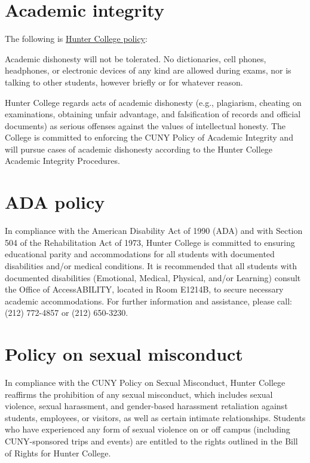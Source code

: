 \documentclass[11pt]{article}
\begin{document}
\section{Academic integrity}
The following is \href{https://www.hunter.cuny.edu/students/student-affairs/office-of-student-conduct/academic-integrity/}{Hunter College policy}:

Academic dishonesty will not be tolerated. No dictionaries, cell phones, headphones, or electronic devices of any kind are allowed during exams, nor is talking to other students, however briefly or for whatever reason.

Hunter College regards acts of academic dishonesty (e.g., plagiarism, cheating on examinations, obtaining unfair advantage, and falsification of records and official documents) as serious offenses against the values of intellectual honesty. The College is committed to enforcing the CUNY Policy of Academic Integrity and will pursue cases of academic dishonesty according to the Hunter College Academic Integrity Procedures.

\section{ADA policy}
In compliance with the American Disability Act of 1990 (ADA) and with Section 504 of the Rehabilitation Act of 1973, Hunter College is committed to ensuring educational parity and accommodations for all students with documented disabilities and/or medical conditions. It is recommended that all students with documented disabilities (Emotional, Medical, Physical, and/or Learning) consult the Office of AccessABILITY, located in Room E1214B, to secure necessary academic accommodations. For further information and assistance, please call: (212) 772-4857 or (212) 650-3230.

\section{Policy on sexual misconduct}
In compliance with the CUNY Policy on Sexual Misconduct, Hunter College reaffirms the prohibition of any sexual misconduct, which includes sexual violence, sexual harassment, and gender-based harassment retaliation against students, employees, or visitors, as well as certain intimate relationships. Students who have experienced any form of sexual violence on or off campus (including CUNY-sponsored trips and events) are entitled to the rights outlined in the Bill of Rights for Hunter College.
\end{document}
